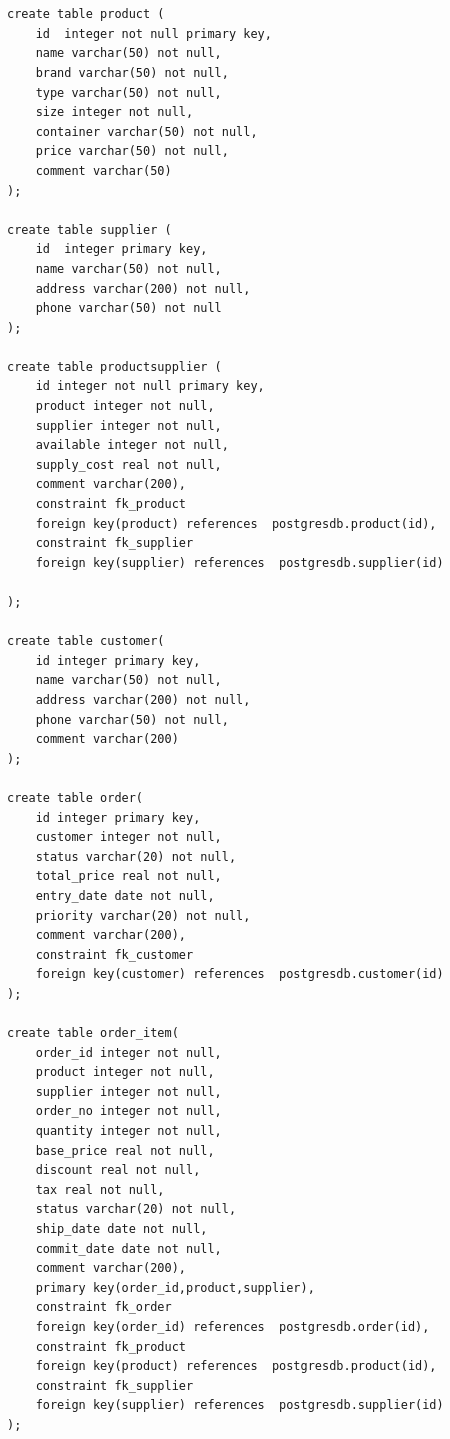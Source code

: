 \documentclass[12pt,oneside]{memoir}
\begin{document}

\begin{lstlisting}[title={setup-postgres-model.sql},captionpos=t]


create table product (
    id  integer not null primary key,
    name varchar(50) not null,
    brand varchar(50) not null,
    type varchar(50) not null,
    size integer not null,
    container varchar(50) not null,
    price varchar(50) not null,
    comment varchar(50)
);

create table supplier (
    id  integer primary key,
    name varchar(50) not null,
    address varchar(200) not null,
    phone varchar(50) not null
);

create table productsupplier (
    id integer not null primary key,
    product integer not null,
    supplier integer not null,
    available integer not null,
    supply_cost real not null,
    comment varchar(200),
    constraint fk_product
    foreign key(product) references  postgresdb.product(id),
    constraint fk_supplier
    foreign key(supplier) references  postgresdb.supplier(id)
    
);

create table customer(
    id integer primary key,
    name varchar(50) not null,
    address varchar(200) not null,
    phone varchar(50) not null,
    comment varchar(200)
);

create table order(
    id integer primary key,
    customer integer not null,
    status varchar(20) not null,
    total_price real not null,
    entry_date date not null,
    priority varchar(20) not null,
    comment varchar(200),
    constraint fk_customer
    foreign key(customer) references  postgresdb.customer(id)
);

create table order_item(
    order_id integer not null,
    product integer not null,
    supplier integer not null, 
    order_no integer not null,
    quantity integer not null,
    base_price real not null,
    discount real not null,
    tax real not null,
    status varchar(20) not null,
    ship_date date not null,
    commit_date date not null,
    comment varchar(200),
    primary key(order_id,product,supplier),
    constraint fk_order
    foreign key(order_id) references  postgresdb.order(id),
    constraint fk_product
    foreign key(product) references  postgresdb.product(id),
    constraint fk_supplier
    foreign key(supplier) references  postgresdb.supplier(id)
);

\end{lstlisting}
\end{document}

